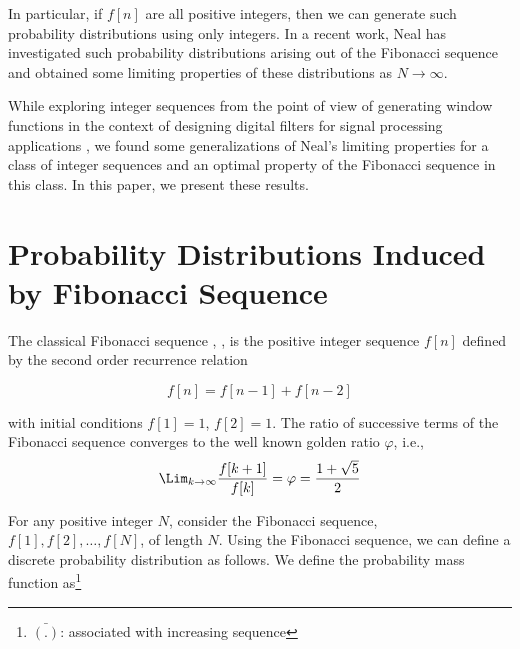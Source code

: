\begin{multicols}{2}
\vspace{-.2cm}

In particular, if $f[n]$ are all positive integers, then we can generate such probability distributions using only integers. In a recent work, Neal \cite{art1-key01} has investigated such probability distributions arising out of the Fibonacci sequence and obtained some limiting properties of these distributions as $N \rightarrow \infty$.

While exploring integer sequences from the point of view of generating window functions in the context of designing digital filters for signal processing applications \cite{art1-key02}, we found some generalizations of Neal's limiting properties for a class of integer sequences and an optimal property of the Fibonacci sequence in this class. In this paper, we present these results.

\section{Probability Distributions Induced by Fibonacci Sequence}\label{section-2}

The classical Fibonacci sequence \cite{art1-key03}, \cite{art1-key04}, is the positive integer sequence $f[n]$ defined by the second order recurrence relation


\vspace{-.4cm}

  \begin{equation}
  f[n] = f[n-1] + f[n-2]\label{eq-2.1}
    \end{equation}
\vspace{-.2cm}

with initial conditions $f[1] = 1$, $f[2] = 1$.
The ratio of successive terms of the Fibonacci sequence converges to the well known golden ratio $\varphi$, i.e.,
\begin{equation}
\Lim_{k \rightarrow \infty} \frac{f[k+1]}{f[k]} = \varphi = \displaystyle{\frac{1 + \sqrt5}{2}}\label{eq-2.2}
\end{equation}

\vspace{-.2cm}

For any positive integer $N$, consider the Fibonacci sequence, $f[1], f[2], \ldots, f[N]$, of length $N$. Using the Fibonacci sequence, we can define a discrete probability distribution as follows. We define the probability mass function as\footnote{${\bar{(.)}}$: associated with increasing sequence}


\end{multicols}

